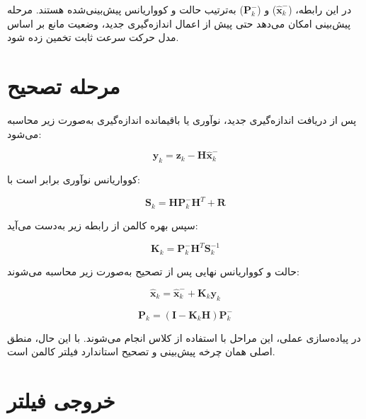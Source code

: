 در این رابطه، ($\hat{\mathbf{x}}^{-}_k$) و ($\mathbf{P}^{-}_k$) به‌ترتیب حالت و کوواریانس پیش‌بینی‌شده هستند. مرحله پیش‌بینی امکان می‌دهد حتی پیش از اعمال اندازه‌گیری جدید، وضعیت مانع بر اساس مدل حرکت سرعت ثابت تخمین زده شود.

\section{مرحله تصحیح}

پس از دریافت اندازه‌گیری جدید، نوآوری یا باقیمانده اندازه‌گیری به‌صورت زیر محاسبه می‌شود:

\begin{equation}
	\mathbf{y}_k =
	\mathbf{z}_k -
	\mathbf{H}\hat{\mathbf{x}}^{-}_k
	\label{eq:app_kalman_innovation}
\end{equation}

کوواریانس نوآوری برابر است با:

\begin{equation}
	\mathbf{S}_k =
	\mathbf{H}\mathbf{P}^{-}_k\mathbf{H}^{T}
	+
	\mathbf{R}
	\label{eq:app_kalman_innovation_cov}
\end{equation}

سپس بهره کالمن از رابطه زیر به‌دست می‌آید:

\begin{equation}
	\mathbf{K}_k =
	\mathbf{P}^{-}_k\mathbf{H}^{T}\mathbf{S}_k^{-1}
	\label{eq:app_kalman_gain}
\end{equation}

حالت و کوواریانس نهایی پس از تصحیح به‌صورت زیر محاسبه می‌شوند:

\begin{equation}
	\hat{\mathbf{x}}_k =
	\hat{\mathbf{x}}^{-}_k
	+
	\mathbf{K}_k\mathbf{y}_k
	\label{eq:app_kalman_correct_state}
\end{equation}

\begin{equation}
	\mathbf{P}_k =
	\left(
	\mathbf{I}
	-
	\mathbf{K}_k\mathbf{H}
	\right)
	\mathbf{P}^{-}_k
	\label{eq:app_kalman_correct_cov}
\end{equation}

در پیاده‌سازی عملی، این مراحل با استفاده از کلاس  انجام می‌شوند. با این حال، منطق اصلی همان چرخه پیش‌بینی و تصحیح استاندارد فیلتر کالمن است.

\section{خروجی فیلتر}

